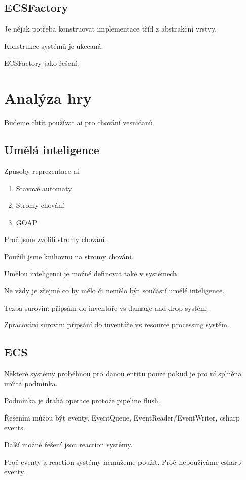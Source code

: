 \subsection{ECSFactory}
Je nějak potřeba konstruovat implementace tříd z abstrakční vrstvy.

Konstrukce systémů je ukecaná.

ECSFactory jako řešení.

\section{Analýza hry}
Budeme chtít používat ai pro chování vesničanů.

\subsection{Umělá inteligence}
Způsoby reprezentace ai:

\begin{enumerate}
    \item Stavové automaty
    \item Stromy chování
    \item GOAP
\end{enumerate}

Proč jsme zvolili stromy chování.

Použili jsme knihovnu na stromy chování.

Umělou inteligenci je možné definovat také v systémech.

Ne vždy je zřejmé co by mělo či nemělo být součástí umělé inteligence.

Tezba surovin: připsání do inventáře vs damage and drop systém.

Zpracování surovin: připsání do inventáře vs resource processing systém. 

\subsection{ECS}
Některé systémy proběhnou pro danou entitu pouze pokud je pro ní splněna určitá podmínka.

Podmínka je drahá operace protože pipeline flush.

Řešením můžou být eventy. EventQueue, EventReader/EventWriter, csharp events.

Další možné řešení jsou reaction systémy.

Proč eventy a reaction systémy nemůžeme použít. Proč nepoužíváme csharp eventy.

